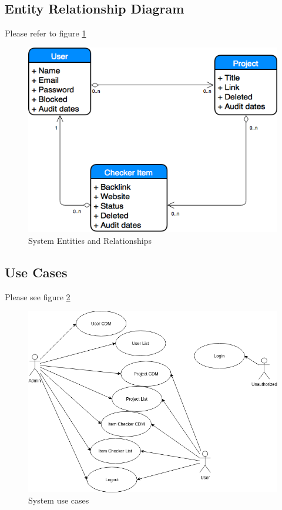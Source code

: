 \subsection{Entity Relationship Diagram}
Please refer to figure \ref{fig:er}
\begin{figure}[ht!]
	\includegraphics[width=\textwidth]{images/Entity-relationship-diagram-Linkchecker}
	\caption{System Entities and Relationships}
	\label{fig:er}
\end{figure}
\subsection{Use Cases}
Please see figure \ref{fig:uc}
\begin{figure}[ht!]
	\includegraphics[width=\textwidth]{images/Use-Cases-Linkchecker}
	\caption{System use cases}
	\label{fig:uc}
\end{figure}


